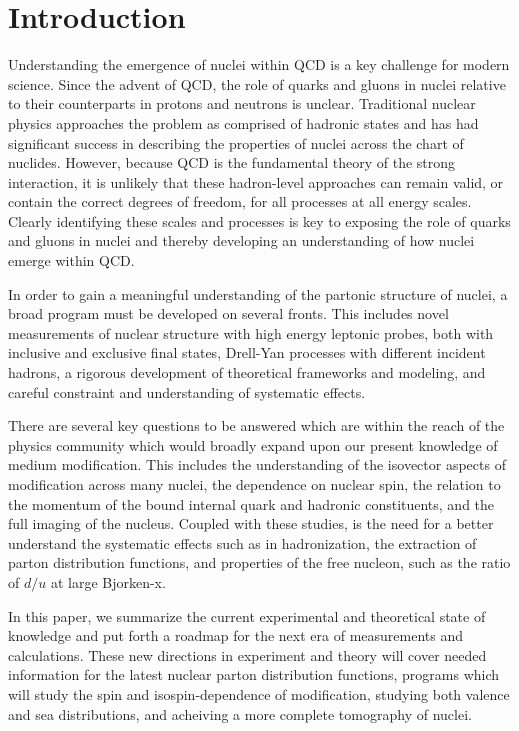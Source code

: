 \section{Introduction}


Understanding the emergence of nuclei within QCD is a key challenge for modern science.  Since the advent of QCD, the role of quarks and gluons in nuclei relative to their counterparts in protons and neutrons is unclear.  Traditional nuclear physics approaches the problem as comprised of hadronic states and has had significant success in describing the properties of nuclei across the chart of nuclides. However, because QCD is the fundamental theory of the strong interaction, it is unlikely that these hadron-level approaches can remain valid, or contain the correct degrees of freedom, for all processes at all energy scales. Clearly identifying these scales and processes is key to exposing the role of quarks and gluons in nuclei and thereby developing an understanding of how nuclei emerge within QCD.

In order to gain a meaningful understanding of the partonic structure of nuclei, a broad program must be developed on several fronts.  This includes novel measurements of nuclear structure with high energy leptonic probes, both with inclusive and exclusive final states, Drell-Yan processes with different incident hadrons, a rigorous development of theoretical frameworks and modeling, and  careful constraint and understanding of systematic effects.

There are several key questions to be answered which are within the reach of the physics community which would broadly expand upon our present knowledge of medium modification.  This includes the understanding of the isovector aspects of modification across many nuclei, the dependence on nuclear spin, the relation to the momentum of the bound internal quark and hadronic constituents, and the full imaging of the nucleus.  Coupled with these studies, is the need for a better understand the systematic effects such as in hadronization, the extraction of parton distribution functions, and properties of the free nucleon, such as the ratio of $d/u$ at large Bjorken-x. 

In this paper, we summarize the current experimental and theoretical state of knowledge and put forth a roadmap for the next era of measurements and calculations.  These new directions in experiment and theory will cover needed information for the latest nuclear parton distribution functions, programs which will study the spin and isospin-dependence of modification, studying both valence and sea distributions, and acheiving a more complete tomography of nuclei.


